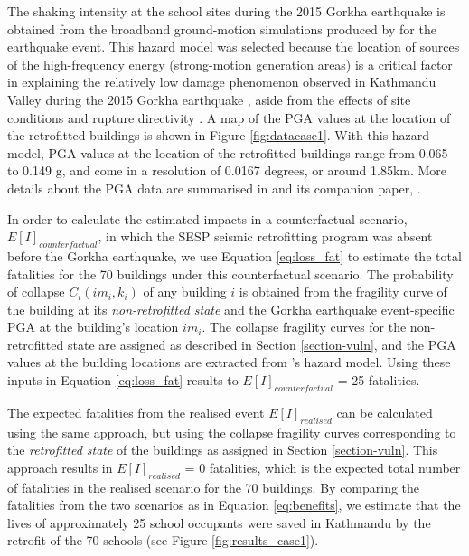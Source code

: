 \documentclass[utf8]{frontiersSCNS} %
\begin{document}
The shaking intensity at the school sites during the 2015 Gorkha earthquake is obtained from the broadband ground-motion simulations produced by \cite{chen20192015} for the earthquake event. This hazard model was selected because the location of sources of the high-frequency energy (strong-motion generation areas) is a critical factor in explaining the relatively low damage phenomenon observed in Kathmandu Valley during the 2015 Gorkha earthquake \citep{gallovivc2016modeling, koketsu2016widespread}, aside from the effects of site conditions and rupture directivity \citep{dixit2015strong, rajaure2017characterizing, gallovivc2016modeling, koketsu2016widespread}. A map of the PGA values at the location of the retrofitted buildings is shown in Figure \ref{fig:datacase1}. With this hazard model, PGA values at the location of the retrofitted buildings range from 0.065 to 0.149 g, and come in a resolution of 0.0167 degrees, or around 1.85km.  More details about the PGA data are summarised in \cite{chen20192015} and its companion paper, \cite{wei20182015}.

In order to calculate the estimated impacts in a counterfactual scenario, $E[I]_{counterfactual}$, in which the SESP seismic retrofitting program was absent before the Gorkha earthquake, we use Equation \ref{eq:loss_fat} to estimate the total fatalities for the 70 buildings under this counterfactual scenario. The probability of collapse $C_{i}(im_{i}, k_{i})$ of any building $i$ is obtained from the fragility curve of the building at its \textit{non-retrofitted state} and the Gorkha earthquake event-specific PGA at the building's location $im_{i}$. The collapse fragility curves for the non-retrofitted state are assigned as described in Section \ref{section-vuln}, and the PGA values at the building locations are extracted from \cite{chen20192015}'s hazard model. Using these inputs in Equation \ref{eq:loss_fat} results to $E[I]_{counterfactual}$ = 25 fatalities.

The expected fatalities from the realised event $E[I]_{realised}$ can be calculated using the same approach, but using the collapse fragility curves corresponding to the \textit{retrofitted state} of the buildings as assigned in Section \ref{section-vuln}. This approach results in $E[I]_{realised}$ = 0 fatalities, which is the expected total number of fatalities in the realised scenario for the 70 buildings. By comparing the fatalities from the two scenarios as in Equation \ref{eq:benefits}, we estimate that the lives of approximately 25 school occupants were saved in Kathmandu by the retrofit of the 70 schools (see Figure \ref{fig:results_case1}).
\end{document}
